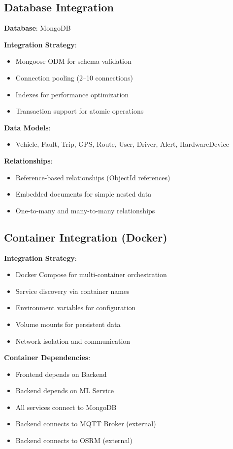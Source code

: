 \subsection{Database Integration}

\textbf{Database}: MongoDB

\textbf{Integration Strategy}:
\begin{itemize}
    \item Mongoose ODM for schema validation
    \item Connection pooling (2--10 connections)
    \item Indexes for performance optimization
    \item Transaction support for atomic operations
\end{itemize}

\textbf{Data Models}:
\begin{itemize}
    \item Vehicle, Fault, Trip, GPS, Route, User, Driver, Alert, HardwareDevice
\end{itemize}

\textbf{Relationships}:
\begin{itemize}
    \item Reference-based relationships (ObjectId references)
    \item Embedded documents for simple nested data
    \item One-to-many and many-to-many relationships
\end{itemize}

\subsection{Container Integration (Docker)}

\textbf{Integration Strategy}:
\begin{itemize}
    \item Docker Compose for multi-container orchestration
    \item Service discovery via container names
    \item Environment variables for configuration
    \item Volume mounts for persistent data
    \item Network isolation and communication
\end{itemize}

\textbf{Container Dependencies}:
\begin{itemize}
    \item Frontend depends on Backend
    \item Backend depends on ML Service
    \item All services connect to MongoDB
    \item Backend connects to MQTT Broker (external)
    \item Backend connects to OSRM (external)
\end{itemize}

